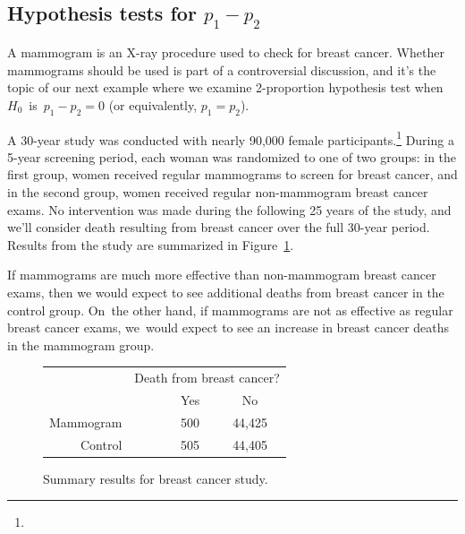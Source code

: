 \subsection{Hypothesis tests for $p_1 - p_2$}


A mammogram is an X-ray procedure used to check for breast cancer. Whether mammograms should be used is part of a controversial discussion, and it's the topic of our next example where we examine 2-proportion hypothesis test when $H_0$~is~$p_1 - p_2 = 0$ (or equivalently, $p_1 = p_2$).

A 30-year study was conducted with nearly 90,000 female participants.\footnote{} During a 5-year screening period, each woman was randomized to one of two groups: in the first group, women received regular mammograms to screen for breast cancer, and in the second group, women received regular non-mammogram breast cancer exams. No intervention was made during the following 25 years of the study, and we'll consider death resulting from breast cancer over the full 30-year period. Results from the study are summarized in Figure~\ref{mammogramStudySummaryTable}.

If mammograms are much more effective than non-mammogram breast cancer exams, then we would expect to see additional deaths from breast cancer in the control group. On~the other hand, if mammograms are not as effective as regular breast cancer exams, we~would expect to see an increase in breast cancer deaths in the mammogram group.

\begin{figure}[h]
\centering
\begin{tabular}{rrcc}
	& \multicolumn{3}{c}{Death from breast cancer?} \\
  \cline{2-4}
 & \ \hspace{3mm}\ & Yes & No \\
  \hline
Mammogram && 500 & 44,425 \\
Control && 505 & 44,405 \\
   \hline
\end{tabular}
\caption{Summary results for breast cancer study.}
\label{mammogramStudySummaryTable}
\end{figure}

